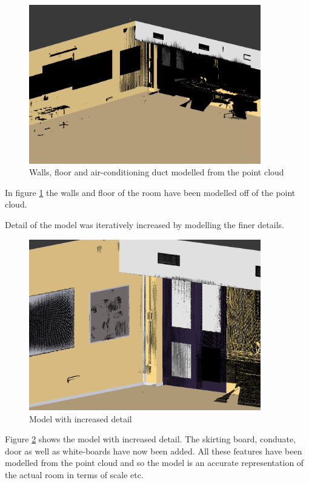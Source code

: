 \documentclass[11pt,a4paper]{report}
\begin{document}
				\begin{figure}[H]
					\centering
					\includegraphics[width=0.9\textwidth]{simple_model_with_pc}
					\caption{Walls, floor and air-conditioning duct modelled from the point cloud}
					\label{fig:simple_model}
				\end{figure}
				
				In figure \ref{fig:simple_model} the walls and floor of the room have been modelled off of the point cloud. 
				
				Detail of the model was iteratively increased by modelling the finer details.
				
				\begin{figure}[H]
					\centering
					\includegraphics[width=0.9\textwidth]{model_with_increased_detail}
					\caption{Model with increased detail}
					\label{fig:more_complex_model}
				\end{figure}
				
				Figure \ref{fig:more_complex_model} shows the model with increased detail. The skirting board, conduate, door as well as white-boards have now been added. All these features have been modelled from the point cloud and so the model is an accurate representation of the actual room in terms of scale etc.
				
\end{document}
